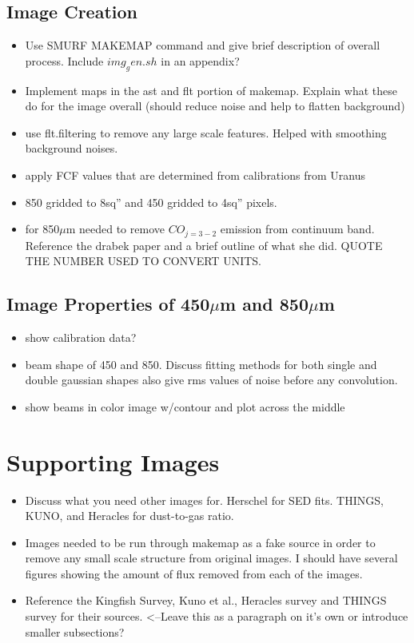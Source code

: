 \subsection{Image Creation}
\begin{itemize}
   \item Use SMURF MAKEMAP command and give brief description of overall process.  Include $img_gen.sh$ in an appendix?
   \item Implement maps in the ast and flt portion of makemap.  Explain what these do for the image overall (should reduce noise and help to flatten background)
   \item use flt.filtering to remove any large scale features.  Helped with smoothing background noises.
   \item apply FCF values that are determined from calibrations from Uranus
   \item 850 gridded to 8sq'' and 450 gridded to 4sq'' pixels.
   \item for 850$\mu$m needed to remove $CO_{j=3-2}$ emission from continuum band.  Reference the drabek paper and a brief outline of what she did.  QUOTE THE NUMBER USED TO CONVERT UNITS.
\end{itemize}

\subsection{Image Properties of 450$\mu$m and 850$\mu$m}
\begin{itemize}
   \item show calibration data?
   \item beam shape of 450 and 850.  Discuss fitting methods for both single and double gaussian shapes also give rms values of noise before any convolution.
   \item show beams in color image w/contour and plot across the middle
\end{itemize}

\section{Supporting Images}

\begin{itemize}
  \item Discuss what you need other images for.  Herschel for SED fits.  THINGS, KUNO, and Heracles for dust-to-gas ratio.
  \item Images needed to be run through makemap as a fake source in order to remove any small scale structure from original images.  I should have several figures showing the amount of flux removed from each of the images.
  \item Reference the Kingfish Survey, Kuno et al., Heracles survey and THINGS survey for their sources.  <--Leave this as a paragraph on it's own or introduce smaller subsections?
  
\end{itemize}

